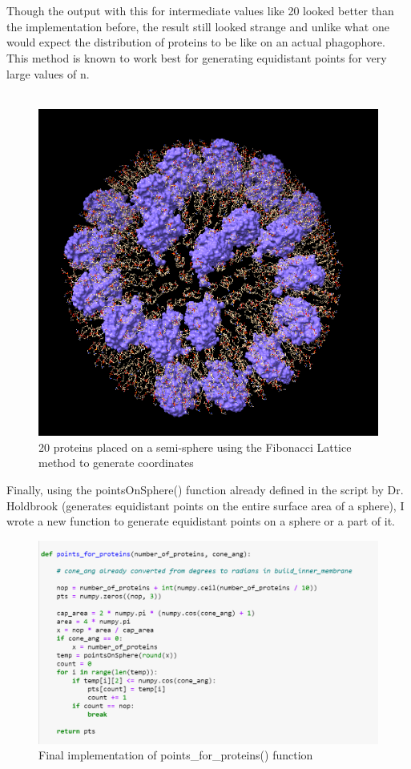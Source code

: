 \documentclass[12pt, a4paper]{report}
\begin{document}
\\~\\
Though the output with this for intermediate values like 20 looked better than the implementation before, the result still looked strange and unlike what one would expect the distribution of proteins to be like on an actual phagophore. This method is known to work best for generating equidistant points for very large values of n. 
\\~\\ 
\begin{figure}[h]
    \includegraphics[scale=1]{images/fibonacci 20.png} 
    \centering 
    \caption{20 proteins placed on a semi-sphere using the Fibonacci Lattice method to generate coordinates}
    \centering
\end{figure} 

\clearpage 
Finally, using the pointsOnSphere() function already defined in the script by Dr. Holdbrook (generates equidistant points on the entire surface area of a sphere), I wrote a new function to generate equidistant points on a sphere or a part of it. 
\begin{figure}[h]
    \includegraphics[scale=0.55]{images/final implementation.png} 
    \centering 
    \caption{Final implementation of points\_for\_proteins() function}
    \centering
\end{figure} 
\end{document}
